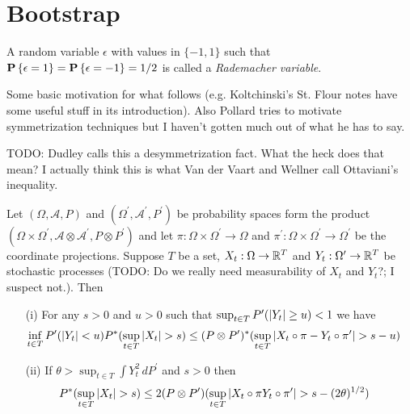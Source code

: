 \section{Bootstrap}

\begin{defn}A random variable $\epsilon$ with values in $\lbrace -1, 1 \rbrace$ such that $\textbf{P}\left \{\epsilon = 1 \right \} = \textbf{P}\left \{\epsilon = -1 \right \} = 1/2$ is called a \emph{Rademacher variable}.
\end{defn}

Some basic motivation for what follows (e.g. Koltchinski's St. Flour notes have some useful stuff in its introduction).   Also Pollard tries to motivate symmetrization techniques but I haven't gotten much out of what he has to say.

TODO: Dudley calls this a desymmetrization fact.  What the heck does that mean?  I actually think this is what Van der Vaart and Wellner call Ottaviani's inequality.  
\begin{lem}Let $(\Omega, \mathcal{A}, P)$ and $(\Omega^\prime, \mathcal{A}^\prime, P^\prime)$ be probability spaces form the product $(\Omega \times \Omega^\prime, \mathcal{A} \otimes  \mathcal{A}^\prime, P \otimes P^\prime)$ and let $\pi : \Omega \times \Omega^\prime \to \Omega$ and $\pi^\prime : \Omega \times \Omega^\prime \to \Omega^\prime$ be the coordinate projections.  Suppose $T$ be a set, $X_t : \Omega \to \mathbb{R}^T$ and $Y_t : \Omega^\prime \to \mathbb{R}^T$ be stochastic processes (TODO: Do we really need measurability of $X_t$ and $Y_t$?; I suspect not.).   Then
\begin{itemize}
\item[(i)] For any $s>0$ and $u > 0$ such that $\sup_{t \in T} P^\prime( \left \vert Y_t \right \vert \geq u )< 1$ we have
\begin{align*}
\inf_{t \in T}  P^\prime( \left \vert Y_t \right \vert < u ) P^*(\sup_{t \in T} \left \vert X_t \right \vert > s) &\leq (P \otimes P^\prime)^* (\sup_{t \in T} \left \vert X_t \circ \pi  - Y_t \circ \pi^\prime \right \vert > s - u)
\end{align*}
\item[(ii)] If $\theta > \sup_{t \in T} \int Y_t^2 \, dP^\prime$ and $s>0$ then
\begin{align*}
P^*(\sup_{t \in T} \left \vert X_t \right \vert > s) &\leq 2 (P \otimes P^\prime) ( \sup_{t \in T} \left \vert X_t \circ \pi  Y_t \circ \pi^\prime \right \vert > s - (2\theta)^{1/2})
\end{align*}
\end{itemize}
\end{lem}
